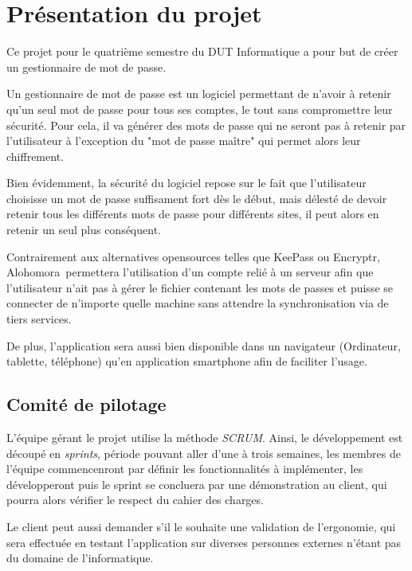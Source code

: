\documentclass[oneside]{report}
\newcommand\softname{Alohomora\ }
\begin{document}
	\chapter{Présentation du projet}
	\vspace{2cm}
	\par Ce projet pour le quatrième semestre du DUT Informatique a pour but de créer un gestionnaire de mot de passe.
	\vspace{.5cm}
	\par Un gestionnaire de mot de passe est un logiciel permettant de n'avoir à retenir qu'un seul mot de passe pour tous ses comptes, le tout sans compromettre leur sécurité. Pour cela, il va générer des mots de passe qui ne seront pas à retenir par l'utilisateur à l'exception du "mot de passe maître" qui permet alors leur chiffrement.
	\vspace{.5cm}
	\par Bien évidemment, la sécurité du logiciel repose sur le fait que l'utilisateur choisisse un mot de passe suffisament fort dès le début, mais délesté de devoir retenir tous les différents mots de passe pour différents sites, il peut alors en retenir un seul plus conséquent.
	\vspace{.5cm}
	\par Contrairement aux alternatives opensources telles que KeePass ou Encryptr, \softname permettera l'utilisation d'un compte relié à un serveur afin que l'utilisateur n'ait pas à gérer le fichier contenant les mots de passes et puisse se connecter de n'importe quelle machine sans attendre la synchronisation via de tiers services.

	\vspace{.5cm}
	\par De plus, l'application sera aussi bien disponible dans un navigateur (Ordinateur, tablette, téléphone) qu'en application smartphone afin de faciliter l'usage.

	\newpage

	\section{Comité de pilotage}
	{
		\par L'équipe gérant le projet utilise la méthode \textit{SCRUM}. Ainsi, le développement est découpé en \textit{sprints}, période pouvant aller d'une à trois semaines, les membres de l'équipe commencenront par définir les fonctionnalités à implémenter, les développeront puis le sprint se concluera par une démonstration au client, qui pourra alors vérifier le respect du cahier des charges.
		\vspace{.5cm}
		\par Le client peut aussi demander s'il le souhaite une validation de l'ergonomie, qui sera effectuée en testant l'application sur diverses personnes externes n'étant pas du domaine de l'informatique.
	}
\end{document}

